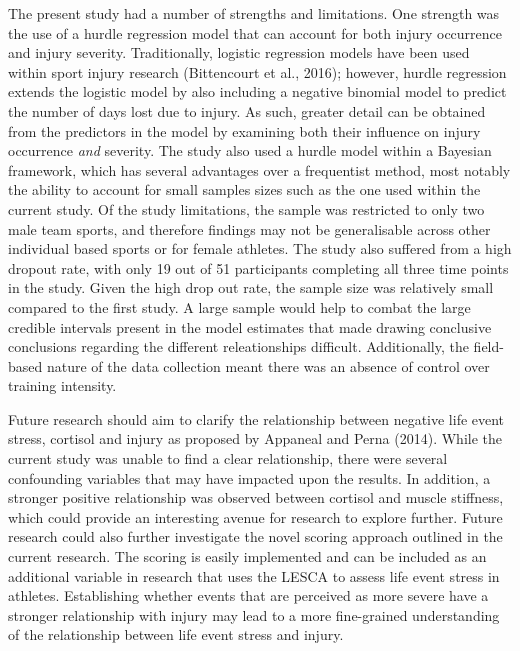 \documentclass[man,floatsintext]{apa6}
\begin{document}
The present study had a number of strengths and limitations.
One strength was the use of a hurdle regression model that can account for both injury occurrence and injury severity.
Traditionally, logistic regression models have been used within sport injury research (Bittencourt et al., 2016); however, hurdle regression extends the logistic model by also including a negative binomial model to predict the number of days lost due to injury.
As such, greater detail can be obtained from the predictors in the model by examining both their influence on injury occurrence \emph{and} severity.
The study also used a hurdle model within a Bayesian framework, which has several advantages over a frequentist method, most notably the ability to account for small samples sizes such as the one used within the current study. Of the study limitations, the sample was restricted to only two male team sports, and therefore findings may not be generalisable across other individual based sports or for female athletes.
The study also suffered from a high dropout rate, with only 19 out of 51 participants completing all three time points in the study.
Given the high drop out rate, the sample size was relatively small compared to the first study.
A large sample would help to combat the large credible intervals present in the model estimates that made drawing conclusive conclusions regarding the different releationships difficult.
Additionally, the field-based nature of the data collection meant there was an absence of control over training intensity.

Future research should aim to clarify the relationship between negative life event stress, cortisol and injury as proposed by Appaneal and Perna (2014).
While the current study was unable to find a clear relationship, there were several confounding variables that may have impacted upon the results.
In addition, a stronger positive relationship was observed between cortisol and muscle stiffness, which could provide an interesting avenue for research to explore further.
Future research could also further investigate the novel scoring approach outlined in the current research.
The scoring is easily implemented and can be included as an additional variable in research that uses the LESCA to assess life event stress in athletes.
Establishing whether events that are perceived as more severe have a stronger relationship with injury may lead to a more fine-grained understanding of the relationship between life event stress and injury.

\clearpage
\end{document}
